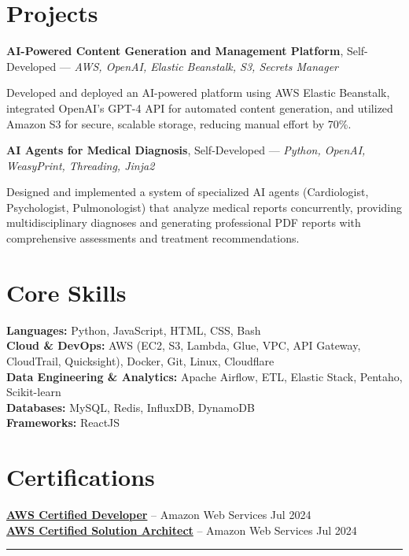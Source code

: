 \documentclass[10pt, letterpaper]{article}
\begin{document}
\section{Projects}
\textbf{\textcolor{myNavy}{AI-Powered Content Generation and Management Platform}}, Self-Developed — \textit{\textcolor{myBlue}{AWS, OpenAI, Elastic Beanstalk, S3, Secrets Manager}}

Developed and deployed an AI-powered platform using AWS Elastic Beanstalk, integrated OpenAI's GPT-4 API for automated content generation, and utilized Amazon S3 for secure, scalable storage, \textcolor{myAccent}{reducing manual effort by 70\%}.

\vspace{0.05cm}

\textbf{\textcolor{myNavy}{AI Agents for Medical Diagnosis}}, Self-Developed — \textit{\textcolor{myBlue}{Python, OpenAI, WeasyPrint, Threading, Jinja2}}

Designed and implemented a system of specialized AI agents (Cardiologist, Psychologist, Pulmonologist) that analyze medical reports concurrently, providing multidisciplinary diagnoses and generating professional PDF reports with comprehensive assessments and treatment recommendations.

\vspace{0.08cm}

\section{Core Skills}
\textbf{\textcolor{myNavy}{Languages:}} Python, JavaScript, HTML, CSS, Bash \\
\textbf{\textcolor{myNavy}{Cloud \& DevOps:}} AWS (EC2, S3, Lambda, Glue, VPC, API Gateway, CloudTrail, Quicksight), Docker, Git, Linux, Cloudflare \\
\textbf{\textcolor{myNavy}{Data Engineering \& Analytics:}} Apache Airflow, ETL, Elastic Stack, Pentaho, Scikit-learn \\
\textbf{\textcolor{myNavy}{Databases:}} MySQL, Redis, InfluxDB, DynamoDB \\
\textbf{\textcolor{myNavy}{Frameworks:}} ReactJS

\vspace{0.08cm}

\section{Certifications}
\textbf{\href{https://cp.certmetrics.com/amazon/en/public/verify/credential/dc7c20379cf94f2699a4d430c31ac969}{AWS Certified Developer}} -- Amazon Web Services \hfill \textcolor{myDarkGray}{Jul 2024} \\
\textbf{\href{https://cp.certmetrics.com/amazon/en/public/verify/credential/7ec7fce4db1f4b1bab3b6f8caa3f509b}{AWS Certified Solution Architect}} -- Amazon Web Services \hfill \textcolor{myDarkGray}{Jul 2024}

\vspace{0.05cm}
\noindent\textcolor{myAccent}{\rule{\textwidth}{0.0pt}}
\end{document}
